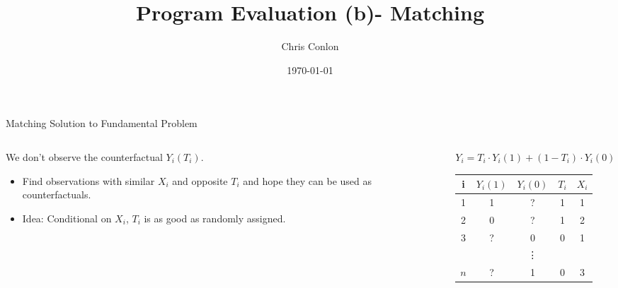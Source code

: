 \documentclass[xcolor=pdftex,dvipsnames,table,mathserif,aspectratio=169]{beamer}
\begin{document}
\title{Program Evaluation (b)- Matching}
\author{Chris Conlon}
\date{\today}

\frame{\titlepage}

\begin{frame}{Matching Solution to Fundamental Problem}
\begin{columns}[T] 
\begin{column}{.65\textwidth}
We don't observe the \alert{counterfactual} $Y_i(T_i)$.
\begin{itemize}
\item Find observations with similar $X_i$ and opposite $T_i$ and hope they can be used as counterfactuals.
\item Idea: Conditional on $X_i$, $T_i$ is as good as randomly assigned.
\end{itemize}
\end{column}%
\hfill%
\begin{column}{.38\textwidth}

  \vspace{20pt}
  
  $Y_{i} = T_{i}\cdot Y_{i}(1) + (1-T_{i}) \cdot Y_{i}(0)$\\
  \vspace{20pt}
  \begin{tabular}{ccccc}
    \toprule
    i & $Y_{i}(1)$ &  $Y_{i}(0)$ & $T_{i}$ & $X_{i}$ \\
    \midrule
    1 &     1      &     \alert{?}      &   1   & 1 \\
    2 &     0      &     \alert{?}      &   1   & 2 \\
    3 &     \alert{?}      &     0      &   0   & 1 \\
     & &  \vdots & & \\
    $n$ &     \alert{?}      &     1      &   0   & 3 \\    
  \end{tabular}
\end{column}%
\end{columns}
\end{frame}
\end{document}
